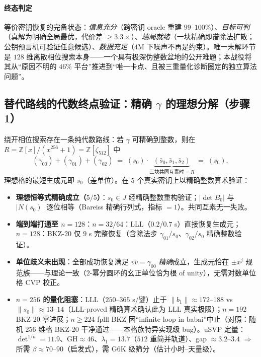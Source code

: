 \documentclass[11pt,a4paper]{ctexart}
\begin{document}
\paragraph{终态判定} 等价密钥恢复的完备状态：\emph{信息充分}（跨密钥 oracle 重建 $99$--$100\%$）、\emph{目标可判}（真解为明确全局最优，代价差 $\ge3.3\times$）、\emph{端局就绪}（一块精确即谱除法扩散；公钥预言机可验证任意候选）、\emph{数据充足}（$4$M 下噪声不再是约束）。唯一未解环节是 $128$ 维离散相位搜索本身——一个具有极深伪整数盆地的公开难题；本战役将其从``原因不明的 $46\%$ 平台''推进到``唯一卡点、且被三重量化诊断圈定的独立算法问题''。

\subsection{替代路线的代数终点验证：精确 $\gamma$ 的理想分解（步骤 1）}\label{sec:ideal}

绕开相位搜索存在一条纯代数路线：若 $\gamma$ 可精确到整数，则在 $R=\mathbb{Z}[x]/(x^{256}+1)=\mathbb{Z}[\zeta_{512}]$ 中
\begin{equation}
(\gamma_{00})+(\gamma_{01})+(\gamma_{02})\;=\;(s_0)\cdot\underbrace{(\bar s_0,\bar s_1,\bar s_2)}_{\text{三块共同互素时}=R}\;=\;(s_0),
\end{equation}
理想格的最短生成元即 $s_0$（差单位）。在 $5$ 个真实密钥上以精确整数算术验证：

\begin{itemize}[nosep]
\item \textbf{理想恒等式精确成立（$5/5$）}：$s_0\in J$ 经精确整数重构验证；$|\det B_0|$ 与 $|N(s_0)|$ 逐位相等（Bareiss 精确行列式，指标 $=1$）。共同互素无一失败。
\item \textbf{端到端打通至 $n{=}128$}：$n{=}32/64$：LLL（$0.2$/$0.7$ s）直接恢复生成元；$n{=}128$：BKZ-20 仅 $9$ s 完整恢复（含除法步 $\gamma_{01}/s_0$、$\gamma_{02}/s_0$ 精确整数验证）。
\item \textbf{单位歧义未出现}：全部成功恢复满足 $v\bar v=\gamma_{00}$ \emph{精确}成立，生成元恰在 $\pm x^j$ 规范族——与理论一致（$2$-幂分圆环的幺正单位恰为根 of unity），无需对数单位格 CVP 校正。
\item \textbf{$n{=}256$ 的量化阻塞}：LLL（$250$--$365$ s/键）止于 $\|b_1\|\approx172$--$188$ vs $\|s_0\|\approx13$--$14$（LLL-proved 精确算术确认此为 LLL 真实极限）；$n{=}192$ BKZ-20 零进展；$n\ge224$ fplll BKZ 因``infinite loop in babai''中止（对照：随机 $256$ 维格 BKZ-20 干净通过——本格族特异实现级 bug）。uSVP 定量：$\det^{1/n}=11.9$、$\mathrm{GH}\approx46$、$\lambda_1=13.7$（$512$ 重简并轨道）、gap $\approx3.2$--$3.4$ $\Rightarrow$ 所需 $\beta\approx70$--$90$（启发式），需 G6K 级筛分（估计小时--天量级）。
\end{itemize}
\end{document}
